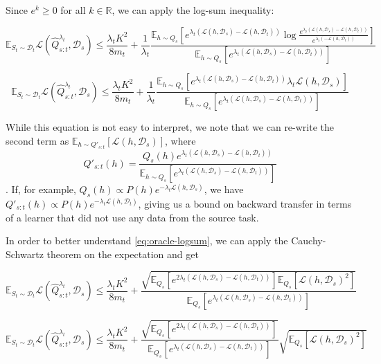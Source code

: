 \documentclass[letterpaper]{article}
\theoremstyle{definition}
\begin{document}
Since $e^k\geq 0$ for all $k\in \mathbb{R}$, we can apply the log-sum inequality:

$$
\mathbb{E}_{S_t\sim \mathcal{D}_t}\mathcal{L}( \hat{Q}^{\lambda_t}_{s:t},\mathcal{D}_s)\leq \frac{\lambda_t K^2}{8m_t}+\frac{1}{\lambda_t}\frac{\mathbb{E}_{h\sim Q_s}\left [e^{\lambda_t(\mathcal{L}(h,\mathcal{D}_s)-\mathcal{L}(h,\mathcal{D}_t))}\log\frac{e^{\lambda_t(\mathcal{L}(h,\mathcal{D}_s)-\mathcal{L}(h,\mathcal{D}_t))}}{e^{\lambda_t(-\mathcal{L}(h,\mathcal{D}_t))}} \right ]}{\mathbb{E}_{h\sim Q_s}\left [e^{\lambda_t(\mathcal{L}(h,\mathcal{D}_s)-\mathcal{L}(h,\mathcal{D}_t))}\right ]}
$$

\begin{equation} \label{eq:oracle-logsum}
\mathbb{E}_{S_t\sim \mathcal{D}_t}\mathcal{L}( \hat{Q}^{\lambda_t}_{s:t},\mathcal{D}_s)\leq \frac{\lambda_t K^2}{8m_t}+\frac{1}{\lambda_t}\frac{\mathbb{E}_{h\sim Q_s}\left [e^{\lambda_t(\mathcal{L}(h,\mathcal{D}_s)-\mathcal{L}(h,\mathcal{D}_t))}\lambda_t\mathcal{L}(h,\mathcal{D}_s) \right ]}{\mathbb{E}_{h\sim Q_s}\left [e^{\lambda_t(\mathcal{L}(h,\mathcal{D}_s)-\mathcal{L}(h,\mathcal{D}_t))}\right ]}
\end{equation}

While this equation is not easy to interpret, we note that we can re-write the second term as $\mathbb{E}_{h\sim Q'_{s:t}}\left [\mathcal{L}(h,\mathcal{D}_s) \right ]$, where $$Q'_{s:t}(h)=\frac{Q_s(h)e^{\lambda_t(\mathcal{L}(h,\mathcal{D}_s)-\mathcal{L}(h,\mathcal{D}_t))}}{\mathbb{E}_{h\sim Q_s}\left [e^{\lambda_t(\mathcal{L}(h,\mathcal{D}_s)-\mathcal{L}(h,\mathcal{D}_t))}\right ]}$$.
If, for example, $Q_s(h)\propto P(h)e^{-\lambda_t\mathcal{L}(h,\mathcal{D}_s)}$, we have $Q'_{s:t}(h)\propto  P(h)e^{-\lambda_t\mathcal{L}(h,\mathcal{D}_t)}$, giving us a bound on backward transfer in terms of a learner that did not use any data from the source task.

In order to better understand \eqref{eq:oracle-logsum}, we can apply the Cauchy-Schwartz theorem on the expectation and get

$$
\mathbb{E}_{S_t\sim \mathcal{D}_t}\mathcal{L}( \hat{Q}^{\lambda_t}_{s:t},\mathcal{D}_s)\leq \frac{\lambda_t K^2}{8m_t}+\frac{\sqrt{\mathbb{E}_{Q_s}\left [e^{2\lambda_t(\mathcal{L}(h,\mathcal{D}_s)-\mathcal{L}(h,\mathcal{D}_t))}\right ]\mathbb{E}_{Q_s}\left [\mathcal{L}(h,\mathcal{D}_s)^2 \right ]}}{\mathbb{E}_{Q_s}\left [e^{\lambda_t(\mathcal{L}(h,\mathcal{D}_s)-\mathcal{L}(h,\mathcal{D}_t))}\right ]}
$$


\begin{equation} \label{eq:oracle-CS-opt}
\mathbb{E}_{S_t\sim \mathcal{D}_t}\mathcal{L}( \hat{Q}^{\lambda_t}_{s:t},\mathcal{D}_s)\leq \frac{\lambda_t K^2}{8m_t}+\frac{\sqrt{\mathbb{E}_{Q_s}\left [e^{2\lambda_t(\mathcal{L}(h,\mathcal{D}_s)-\mathcal{L}(h,\mathcal{D}_t))}\right ]}}{\mathbb{E}_{Q_s}\left [e^{\lambda_t(\mathcal{L}(h,\mathcal{D}_s)-\mathcal{L}(h,\mathcal{D}_t))}\right ]}\sqrt{\mathbb{E}_{Q_s}\left [\mathcal{L}(h,\mathcal{D}_s)^2 \right ]}
\end{equation}
\end{document}
